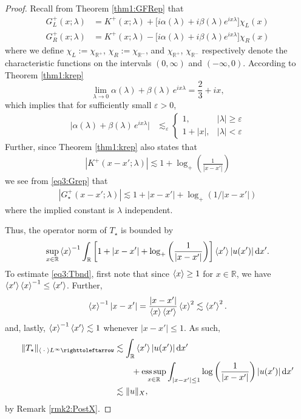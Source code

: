 \documentclass[../dissertation]{subfiles}
\begin{document}
\begin{proof}
	Recall from Theorem \ref{thm1:GFRep} that
	\begin{subequations}\label{eq3:Grep}
		\begin{align}
			G_L^+(x; \lambda) 
				&= K^+(x; \lambda) + 
				\big[i \alpha(\lambda) + i \beta(\lambda) e^{ix \lambda}\big]
					 \chi_L(x) \\
			G_R^+(x; \lambda)
				&= K^+(x; \lambda) -
				\big[i \alpha(\lambda) + i \beta(\lambda) e^{ix \lambda}\big]
					 \chi_R(x)
		\end{align}
	\end{subequations}
	where we define $\chi_L:=\chi_{\mathbb R^+}$,  $\chi_R:= \chi_{\mathbb R^-}$,
	and $\chi_{\mathbb R^+}$, $\chi_{\mathbb R^-}$
	respectively denote the characteristic functions on the intervals
	$(0, \infty)$ and $(-\infty, 0)$.
	According to Theorem \ref{thm1:krep}
	\[
		\lim_{\lambda \to 0} 
			\alpha(\lambda) + \beta(\lambda) \, e^{ix\lambda}
			= \frac{2}{3} + i x,
	\]
	which implies that for sufficiently small $\varepsilon > 0$, 
	\begin{align}\label{eq2:polesumbnd}
		\big| \alpha(\lambda) + \beta(\lambda) \, e^{ix\lambda} \big|
			&\lesssim_{\varepsilon}
				\begin{cases}
					1, & |\lambda| \geq \varepsilon \\
					1 + |x|, & |\lambda| < \varepsilon
				\end{cases}
	\end{align}
	Further, since Theorem \ref{thm1:krep} also states that 
	\begin{align*}
		|K^+(x-x'; \lambda)| \lesssim 1 + \log_+\left(\frac{1}{|x-x'|}\right) 
	\end{align*}
	we see from \eqref{eq3:Grep} that 
	\begin{align}
		|G_\star^+ (x - x'; \lambda)|
			\lesssim 1 + |x-x'| + \log_+(1/|x-x'|)
	\end{align}
	where the implied constant is $\lambda$ independent. 

	Thus, the operator norm of $T_\star$
	is bounded by 
	\begin{align}\label{eq3:Tbnd}
		\sup_{x\in \mathbb R} \left\langle x \right\rangle^{-1}
				\int_{\mathbb R}
					\left[1 + |x-x'| + \log_+\left(\frac{1}{|x-x'|}\right)\right]
					\left\langle x' \right\rangle |u(x')|
				\, \mathrm{d}x'.
	\end{align}
	To estimate \eqref{eq3:Tbnd}, first note that 
	since $\left\langle x \right\rangle \geq 1$ for $x\in \mathbb R$, we have $\left\langle x' \right\rangle\left\langle x \right\rangle^{-1} 
	\leq \left\langle x' \right\rangle$. Further, 
	\[
		\left\langle x \right\rangle^{-1} |x - x'| 
			= \frac{|x-x'|}{\left\langle x \right\rangle\left\langle x' \right\rangle}\left\langle x \right\rangle^2 
			\lesssim \left\langle x' \right\rangle^2.
	\]
	and, lastly, $\left\langle x \right\rangle^{-1} \left\langle x' \right\rangle \lesssim 1$ whenever $|x-x'|\leq 1$. 
	As such, 
	\begin{align*}
		\|T_\star\|_{\inn{\dotarg} L^\infty \toitself}
			&\lesssim 
				\int_{\mathbb R} \inn{x'} |u(x')| \, \mathrm{d}x' 
				\\
			&\qquad+ \esssup_{x\in \mathbb R} 
				\int_{|x-x'|\leq 1} 
					\log\left(\frac{1}{|x-x'|}\right)
					|u(x')|
				\, \mathrm{d}x' 
				\\
		&\lesssim \|u\|_X,
	\end{align*}
	by Remark \ref{rmk2:PostX}.
\end{proof}
\end{document}
